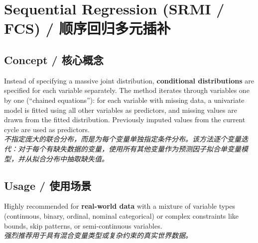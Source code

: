 \documentclass[9pt, a4paper]{article}
\begin{document}
\section{Sequential Regression (SRMI / FCS) / 顺序回归多元插补}

\subsection{Concept / 核心概念}
\begin{tcolorbox}[defbox]
    Instead of specifying a massive joint distribution, \textbf{conditional distributions} are specified for each variable separately. The method iterates through variables one by one (``chained equations''): for each variable with missing data, a univariate model is fitted using all other variables as predictors, and missing values are drawn from the fitted distribution. Previously imputed values from the current cycle are used as predictors.\\
    \textit{不指定庞大的联合分布，而是为每个变量单独指定条件分布。该方法逐个变量迭代：对于每个有缺失数据的变量，使用所有其他变量作为预测因子拟合单变量模型，并从拟合分布中抽取缺失值。}
\end{tcolorbox}

\subsection{Usage / 使用场景}
Highly recommended for \textbf{real-world data} with a mixture of variable types (continuous, binary, ordinal, nominal categorical) or complex constraints like bounds, skip patterns, or semi-continuous variables.\\
\textit{强烈推荐用于具有混合变量类型或复杂约束的真实世界数据。}
\end{document}
